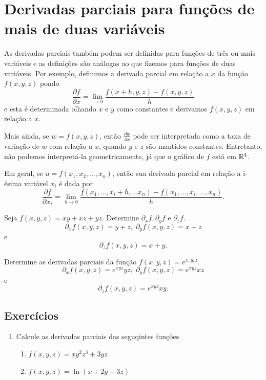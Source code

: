 \section{Derivadas parciais para funções de mais de duas variáveis}

As derivadas parciais também podem ser definidas para funções de três ou mais variáveis e as definições são análogas ao que fizemos para funções de duas variáveis. Por exemplo, definimos a derivada parcial em relação a \(x\) da função \(f(x,y,z)\) pondo \[\frac{\partial f}{\partial x} = \lim_{\to 0} \frac{f(x+h,y,z) - f(x,y,z)}{h}\] e esta é determinada olhando \(x\) e \(y\) como constantes e derivamos \(f(x,y,z)\) em relação a \(x\).

Mais ainda, se \(w = f(x,y,z)\), então \(\frac{\partial w}{\partial x}\) pode ser interpretada como a taxa de variação de \(w\) com relação a \(x\), quando \(y\) e \(z\) são mantidos constantes. Entretanto, não podemos interpretá-la geometricamente, já que o gráfico de \(f\) está em \(\mathbb{R}^4\).

Em geral, se \(u = f(x_1,x_2,\dots,x_n)\), então sua derivada parcial em relação a i-ésima variável \(x_i\) é dada por \[\frac{\partial f}{\partial x_i} = \lim_{h\to 0}\frac{f(x_1,\dots,x_i+h,\dots x_n) - f(x_1,\dots,x_i,\dots,x_n)}{h}.\]

\begin{example}
    Seja \(f(x,y,z) = xy + xz + yz.\) Determine \(\partial_x f, \partial_y f\) e \(\partial_z f\). \[\partial_x f(x,y,z) = y + z,\; \partial_y f(x,y,z) = x + z \] e \[\partial_z f(x,y,z) = x + y.\]
\end{example}

\begin{example}
    Determine as derivadas parciais da função \(f(x,y,z) = e^{x,y,z}\). \[\partial_x f(x,y,z) = e^{xyz} yz,\; \partial_y f(x,y,z) = e^{xyz} xz\] e \[\partial_z f(x,y,z) = e^{xyz} xy.\]
\end{example}

\subsection{Exercícios}

\begin{enumerate}
    \item Calcule as derivadas parciais das seguqintes funções
        \begin{enumerate}
            \item $f(x,y,z) = xy^2z^3 + 3yz$
            \item $f(x,y,z) = \ln(x+2y+3z)$
        \end{enumerate}
\end{enumerate}

